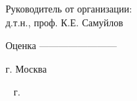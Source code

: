 \begin{titlepage}
\begin{minipage}{.45\textwidth}
    Руководитель от организации:\\
    д.т.н., проф. К.Е. Самуйлов
    
  \end{minipage}%
  \hfill
  
   
\vfill
Оценка ————————

\centering
г. Москва

\
 г.
\end{titlepage}
